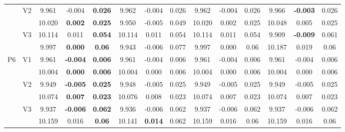 \documentclass[12pt,a4paper]{article}
\begin{document}
\begin{sidewaystable}[ht]
{\begin{tabular}{cc|ccc|ccc|ccc|ccc|}
   & \multirow{2}{*}{V2} & 9.961 & -0.004 & \textbf{0.026} & 9.962 & -0.004 & 0.026 & 9.962 & -0.004 & 0.026 & 9.966 & \textbf{-0.003} & 0.026 \\ 
   &  & 10.020 & \textbf{0.002} & \textbf{0.025} & 9.950 & -0.005 & 0.049 & 10.020 & 0.002 & 0.025 & 10.048 & 0.005 & 0.025 \\ 
   & \multirow{2}{*}{V3} & 10.114 & 0.011 & \textbf{0.054} & 10.114 & 0.011 & 0.054 & 10.114 & 0.011 & 0.054 & 9.909 & \textbf{-0.009} & 0.061 \\ 
   &  & 9.997 & \textbf{0.000} & \textbf{0.06} & 9.943 & -0.006 & 0.077 & 9.997 & 0.000 & 0.06 & 10.187 & 0.019 & 0.06 \\ 
   \hline \hline\multirow{6}{*}{P6} & \multirow{2}{*}{V1} & 9.961 & \textbf{-0.004} & \textbf{0.006} & 9.961 & -0.004 & 0.006 & 9.961 & -0.004 & 0.006 & 9.961 & -0.004 & 0.006 \\ 
   &  & 10.004 & \textbf{0.000} & \textbf{0.006} & 10.004 & 0.000 & 0.006 & 10.004 & 0.000 & 0.006 & 10.004 & 0.000 & 0.006 \\ 
   & \multirow{2}{*}{V2} & 9.949 & \textbf{-0.005} & \textbf{0.025} & 9.948 & -0.005 & 0.025 & 9.949 & -0.005 & 0.025 & 9.949 & -0.005 & 0.025 \\ 
   &  & 10.074 & \textbf{0.007} & \textbf{0.023} & 10.076 & 0.008 & 0.023 & 10.074 & 0.007 & 0.023 & 10.074 & 0.007 & 0.023 \\ 
   & \multirow{2}{*}{V3} & 9.937 & \textbf{-0.006} & \textbf{0.062} & 9.936 & -0.006 & 0.062 & 9.937 & -0.006 & 0.062 & 9.937 & -0.006 & 0.062 \\ 
   &  & 10.159 & 0.016 & \textbf{0.06} & 10.141 & \textbf{0.014} & 0.062 & 10.159 & 0.016 & 0.06 & 10.159 & 0.016 & 0.06 \\ 
   \hline
\end{tabular}
}
\end{sidewaystable}
\end{document}
